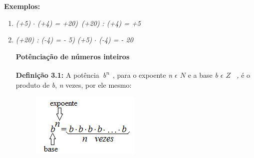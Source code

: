\documentclass[12pt]{article}
\renewcommand{\_}{\kern-1.5pt\textunderscore\kern-1.5pt}
\begin{document}
\vspace{\baselineskip}
\textbf{Exemplos:\ \ \  }\par

\setlength{\parskip}{6.0pt}
\begin{enumerate}
	\item \textit{(+5) $ \cdot $  (+4) = +20\tab \tab {})\  (+20) : (+4) = +5}\par

	\item \textit{(+20) : (-4) = - 5\tab \tab {}) (+5) $ \cdot $  (-4) = - 20\tab \tab }\par


\vspace{\baselineskip}
\setlength{\parskip}{0.0pt}
\textbf{Potênciação de números inteiros}\par

\par 
\setlength{\parskip}{8.04pt}
\textbf{Definição 3.1: }A potência\  \textit{b\textsuperscript{n}}\  , para  o expoente \textit{n $ \epsilon $   \( N \) } e a base \textit{b $ \epsilon $   \( Z \) \  ,} é o produto de \textit{b}, \textit{n} vezes, por ele mesmo:\par




\begin{figure}[H]
	\begin{Center}
		\includegraphics[width=2.05in,height=1.2in]{./media/image8.png}
	\end{Center}
\end{figure}



\setlength{\parskip}{0.0pt}
\tab \tab \tab \tab \par



\end{enumerate}
\end{document}
